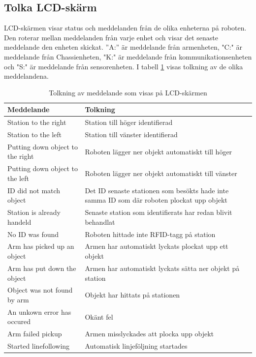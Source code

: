 \documentclass[a4paper,12pt]{article}
\begin{document}
\subsection{Tolka LCD-skärm}
LCD-skärmen visar status och meddelanden från de olika enheterna på roboten. Den roterar mellan meddelanden från varje enhet och visar det senaste meddelande den enheten skickat. ''A:'' är meddelande från armenheten, "C:" är meddelande från Chassienheten, "K:" är meddelande från kommunikationsenheten och "S:" är meddelande från sensorenheten. 
I tabell \ref{tab:lcd} visas tolkning av de olika meddelandena.

\begin{table}[H]
\centering
    \begin{tabularx}{\textwidth}{|l|X|}
        \hline \textbf{Meddelande} & \textbf{Tolkning} \\ \hline
    Station to the right & Station till höger identifierad \\ \hline
    Station to the left & Station till vänster identifierad \\ \hline
    Putting down object to the right & Roboten lägger ner objekt automatiskt till höger\\ \hline
    Putting down object to the left & Roboten lägger ner objekt automatiskt till vänster \\ \hline
    ID did not match object & Det ID senaste stationen som besökts hade inte samma ID som där roboten plockat upp objekt \\ \hline
    Station is already handeld & Senaste station som identifierats har redan blivit behandlat\\ \hline
    No ID was found & Roboten hittade inte RFID-tagg på station \\ \hline
    Arm has picked up an object & Armen har automatiskt lyckats plockat upp ett objekt\\ \hline
    Arm has put down the object & Armen har automatiskt lyckats sätta ner objekt på station \\ \hline
    Object was not found by arm & Objekt har hittats på stationen \\ \hline
    An unkown error has occured & Okänt fel \\ \hline
    Arm failed pickup & Armen misslyckades att plocka upp objekt \\ \hline
    Started linefollowing & Automatisk linjeföljning startades \\ \hline
    \end{tabularx}
\caption{Tolkning av meddelande som visas på LCD-skärmen}
\label{tab:lcd}
\end{table}
\end{document}
